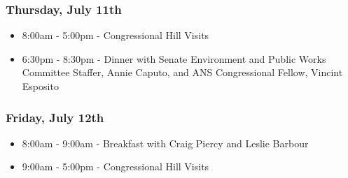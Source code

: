 \subsubsection*{Thursday, July 11th}
\begin{itemize}
  \item 8:00am - 5:00pm - Congressional Hill Visits
  \item 6:30pm - 8:30pm - Dinner with Senate Environment and Public Works
    Committee Staffer, Annie Caputo, and ANS Congressional Fellow, Vincint
    Esposito
\end{itemize}

\subsubsection*{Friday, July 12th}
\begin{itemize}
  \item 8:00am - 9:00am - Breakfast with Craig Piercy and Leslie Barbour
  \item 9:00am - 5:00pm - Congressional Hill Visits
\end{itemize}
